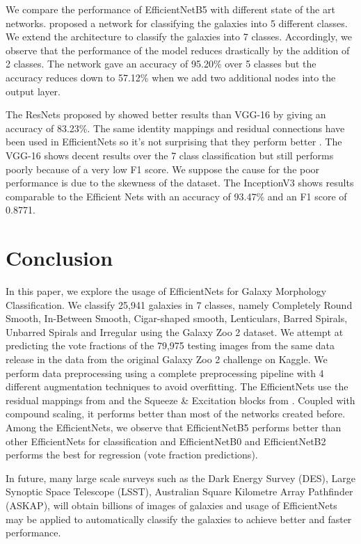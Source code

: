 \documentclass[fleqn,usenatbib]{mnras}
\begin{document}
\hspace*{0.25 in}We compare the performance of EfficientNetB5 with different state of the art networks. \citet{dai2018galaxy} proposed a network for classifying the galaxies into 5 different classes. We extend the architecture to classify the galaxies into 7 classes. Accordingly, we observe that the performance of the model reduces drastically by the addition of 2 classes. The network gave an accuracy of 95.20\% over 5 classes but the accuracy reduces down to 57.12\% when we add two additional nodes into the output layer. 


The ResNets proposed by \citet{he2016} showed better results than VGG-16 by giving an accuracy of 83.23\%. The same identity mappings and residual connections have been used in EfficientNets so it's not surprising that they perform better \citep{tan2019efficientnet}. The VGG-16 shows decent results over the 7 class classification but still performs poorly because of a very low F1 score. We suppose the cause for the poor performance is due to the skewness of the dataset. The InceptionV3 shows results comparable to the Efficient Nets with an accuracy of 93.47\% and an F1 score of 0.8771.

\section{Conclusion}
\hspace*{0.25 in}In this paper, we explore the usage of EfficientNets for Galaxy Morphology Classification. We classify 25,941 galaxies in 7 classes, namely Completely Round Smooth, In-Between Smooth, Cigar-shaped smooth, Lenticulars, Barred Spirals, Unbarred Spirals and Irregular using the Galaxy Zoo 2 dataset.  We attempt at predicting the vote fractions of the 79,975 testing images from the same data release in the data from the original Galaxy Zoo 2 challenge on Kaggle. We perform data preprocessing using a complete preprocessing pipeline with 4 different augmentation techniques to avoid overfitting. The EfficientNets use the residual mappings from \citet{he2016} and the Squeeze \& Excitation blocks from \citet{hu2018squeeze}. Coupled with compound scaling, it performs better than most of the networks created before. Among the EfficientNets, we observe that EfficientNetB5 performs better than other EfficientNets for classification and EfficientNetB0 and EfficientNetB2 performs the best for regression (vote fraction predictions).

In future, many large scale surveys such as the Dark Energy Survey (DES), Large Synoptic Space Telescope (LSST), Australian Square Kilometre Array Pathfinder (ASKAP), will obtain billions of images of galaxies and usage of EfficientNets may be applied to automatically classify the galaxies to achieve better and faster performance. 
\end{document}
